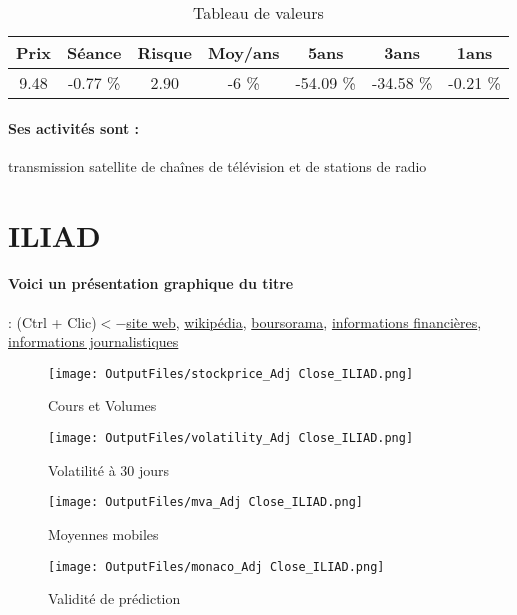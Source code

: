 \documentclass[11pt,a4paper]{report}%
\begin{document}
\begin{table}[H]
  \centering
    \begin{tabular}{|c|c|c|c|c|c|c|}
    \hline
    Prix & Séance & Risque  & Moy/ans & 5ans & 3ans & 1ans \\
    \hline
    9.48 &    -0.77 \%    & 2.90 & -6 \% & -54.09 \% & -34.58 \% & -0.21 \% \\
    \hline
    \end{tabular}%
        \label{tab:table_EUTELSAT COMM-0.21ICA}%
      \caption{Tableau de valeurs}
\end{table}%

\paragraph{Ses activités sont : } transmission satellite de chaînes de télévision et de stations de radio 
    
    \newpage

\section{ILIAD}

\paragraph{Voici un présentation graphique du titre} : (Ctrl + Clic)$<-$\href{https://www.iliad.fr/fr/finances/}{site web}, \href{https://fr.wikipedia.org/wiki/Iliad}{wikipédia}, \href{https://www.boursorama.com/cours/1rPILD}{boursorama}, \href{https://www.qwant.com/?q=site:https:%2f%2fwww.easybourse.com%2faction-societe%2fILIAD&t=web&client=ext-firefox-hp}{informations financières}, \href{https://bourse.lerevenu.com/cours-de-bourse/fiche-valeur-synthese/ILIAD/ILD-FR}{informations journalistiques}
\begin{figure}[!htb]
   \begin{minipage}{0.5\textwidth}
     \centering
     \texttt{[image: OutputFiles/stockprice\_Adj Close\_ILIAD.png]}
     \caption{Cours et Volumes}\label{Fig:price_ILIAD}
   \end{minipage}\hfill
   \begin{minipage}{0.5\textwidth}
     \centering
     \texttt{[image: OutputFiles/volatility\_Adj Close\_ILIAD.png]}
     \caption{Volatilité à 30 jours}\label{Fig:volat_ILIAD}
   \end{minipage}
\end{figure}
\begin{figure}[!htb]
   \begin{minipage}{0.5\textwidth}
     \centering
     \texttt{[image: OutputFiles/mva\_Adj Close\_ILIAD.png]}
     \caption{Moyennes mobiles}\label{Fig:mva_ILIAD}
   \end{minipage}\hfill
   \begin{minipage}{0.5\textwidth}
     \centering
     \texttt{[image: OutputFiles/monaco\_Adj Close\_ILIAD.png]}
     \caption{Validité de prédiction}\label{Fig:prediction_ILIAD}
   \end{minipage}
\end{figure}
\end{document}
